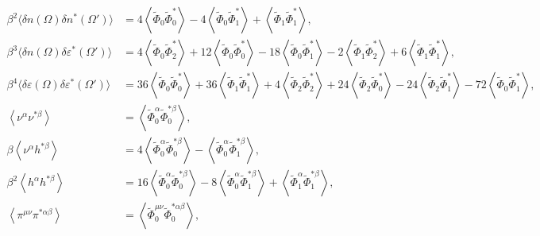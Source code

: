 \documentclass[aps,prd,preprint,nofootinbib,amsmath,amssymb,showpacs,longbibliography,singlecolumn,superscriptaddress,10pt]{revtex4-1}
\theoremstyle{plain}
\theoremstyle{definition}
\begin{document}
\begin{equation}
\label{eq:scalar-Tmunu-Nmu-corrs}
\begin{aligned}
\beta^{2} \langle \delta n (\Omega) \delta n^{*}(\Omega')\rangle 
& 
= 
4
\left\langle \widetilde{\Phi}_{0}
\widetilde{\Phi}_{0}^{*}
 \right\rangle
-
4
\left\langle \widetilde{\Phi}_{0}
\widetilde{\Phi}_{1}^{*}\right\rangle
+
\left\langle \widetilde{\Phi}_{1}
\widetilde{\Phi}_{1}^{*}
 \right\rangle,
 \\
\beta^{3} \langle \delta n (\Omega) \delta \varepsilon^{*}(\Omega')\rangle 
& =
4
\left\langle \widetilde{\Phi}_{0}
\widetilde{\Phi}_{2}^{*}
 \right\rangle
 +
12 
\left\langle \widetilde{\Phi}_{0}
\widetilde{\Phi}_{0}^{*}
 \right\rangle
-
18 \left\langle \widetilde{\Phi}_{0}
\widetilde{\Phi}_{1}^{*}
 \right\rangle
-2 \left\langle \widetilde{\Phi}_{1}
\widetilde{\Phi}_{2}^{*}  \right\rangle
+ 
6 \left\langle \widetilde{\Phi}_{1}
\widetilde{\Phi}_{1}^{*}
 \right\rangle,
 \\
\beta^{4} \langle \delta \varepsilon (\Omega) \delta \varepsilon^{*}(\Omega')\rangle 
&=
36 \left\langle \widetilde{\Phi}_{0}
\widetilde{\Phi}_{0}^{*}
 \right\rangle
+
36 \left\langle \widetilde{\Phi}_{1}
\widetilde{\Phi}_{1}^{*} \right\rangle
+
4
\left\langle \widetilde{\Phi}_{2}
\widetilde{\Phi}_{2}^{*} \right\rangle
+
24
\left\langle \widetilde{\Phi}_{2}
\widetilde{\Phi}_{0}^{*} \right\rangle
-
24
\left\langle \widetilde{\Phi}_{2}
\widetilde{\Phi}_{1}^{*} \right\rangle
-
72
\left\langle \widetilde{\Phi}_{0}
\widetilde{\Phi}_{1}^{*} \right\rangle, \\
\left\langle \nu^{\alpha}
\nu^{*\beta} \right\rangle
&=
\left\langle \widetilde{\Phi}_{0}^{\alpha} 
\widetilde{\Phi}_{0}^{*\beta}
\right\rangle,
\\
\beta\left\langle \nu^{\alpha}
h^{*\beta} \right\rangle
&
=
4
\left\langle \widetilde{\Phi}_{0}^{\alpha} 
\widetilde{\Phi}_{0}^{*\beta}
\right\rangle
-
\left\langle \widetilde{\Phi}_{0}^{\alpha} 
\widetilde{\Phi}_{1}^{*\beta}
\right\rangle
,
\\
\beta^{2}\left\langle h^{\alpha}
h^{*\beta} \right\rangle
&
=
16
\left\langle \widetilde{\Phi}_{0}^{\alpha} 
\widetilde{\Phi}_{0}^{*\beta}
\right\rangle
-
8
\left\langle \widetilde{\Phi}_{0}^{\alpha} 
\widetilde{\Phi}_{1}^{*\beta}
\right\rangle
+
\left\langle \widetilde{\Phi}_{1}^{\alpha} 
\widetilde{\Phi}_{1}^{*\beta}
\right\rangle
,
\\
\left\langle \pi^{\mu \nu} \pi^{*\alpha\beta} \right\rangle
&=
\left\langle  \widetilde{\Phi}_{0}^{\mu \nu}
\widetilde{\Phi}_{0}^{*\alpha \beta}
\right\rangle,
\end{aligned}    
\end{equation}
\end{document}
